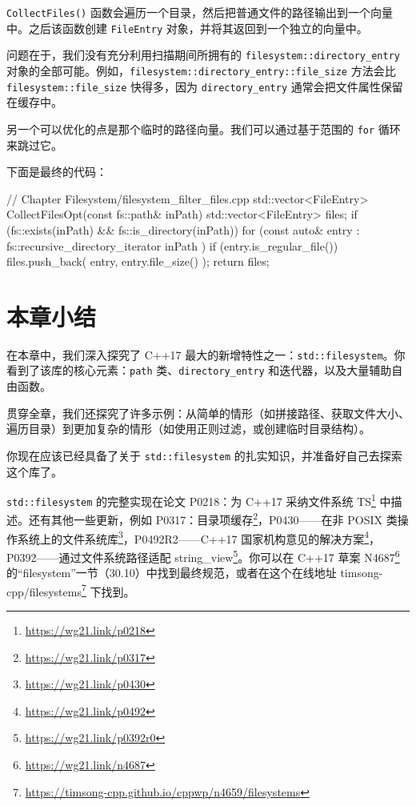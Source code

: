
\texttt{CollectFiles()} 函数会遍历一个目录，然后把普通文件的路径输出到一个向量中。之后该函数创建 \texttt{FileEntry} 对象，并将其返回到一个独立的向量中。

问题在于，我们没有充分利用扫描期间所拥有的 \texttt{filesystem::directory\_entry} 对象的全部可能。例如，\texttt{filesystem::directory\_entry::file\_size} 方法会比 \texttt{filesystem::file\_size} 快得多，因为 \texttt{directory\_entry} 通常会把文件属性保留在缓存中。

另一个可以优化的点是那个临时的路径向量。我们可以通过基于范围的 \texttt{for} 循环来跳过它。

下面是最终的代码：

\begin{codebox}[cpp]
// Chapter Filesystem/filesystem_filter_files.cpp
std::vector<FileEntry> CollectFilesOpt(const fs::path& inPath)
{
    std::vector<FileEntry> files;
    if (fs::exists(inPath) && fs::is_directory(inPath))
    {
        for (const auto& entry : fs::recursive_directory_iterator{ inPath })
        {
            if (entry.is_regular_file())
                files.push_back({ entry, entry.file_size() });
        }
    }
    return files;
}
\end{codebox}

\section{本章小结}

在本章中，我们深入探究了 C++17 最大的新增特性之一：\texttt{std::filesystem}。你看到了该库的核心元素：\texttt{path} 类、\texttt{directory\_entry} 和迭代器，以及大量辅助自由函数。

贯穿全章，我们还探究了许多示例：从简单的情形（如拼接路径、获取文件大小、遍历目录）到更加复杂的情形（如使用正则过滤，或创建临时目录结构）。

你现在应该已经具备了关于 \texttt{std::filesystem} 的扎实知识，并准备好自己去探索这个库了。

\texttt{std::filesystem} 的完整实现在论文 P0218：为 C++17 采纳文件系统 TS\footnote{\url{https://wg21.link/p0218}} 中描述。还有其他一些更新，例如 P0317：目录项缓存\footnote{\url{https://wg21.link/p0317}}，P0430——在非 POSIX 类操作系统上的文件系统库\footnote{\url{https://wg21.link/p0430}}，P0492R2——C++17 国家机构意见的解决方案\footnote{\url{https://wg21.link/p0492}}，P0392——通过文件系统路径适配 string\_view\footnote{\url{https://wg21.link/p0392r0}}。你可以在 C++17 草案 N4687\footnote{\url{https://wg21.link/n4687}} 的“filesystem”一节（30.10）中找到最终规范，或者在这个在线地址 timsong-cpp/filesystems\footnote{\url{https://timsong-cpp.github.io/cppwp/n4659/filesystems}} 下找到。

